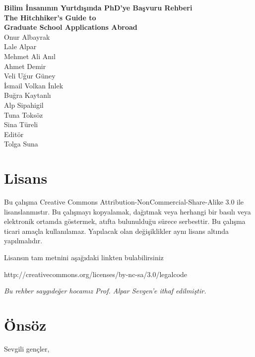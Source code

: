 \documentclass[12pt]{article}
\theoremstyle{break}
\begin{document}
%
%
\thispagestyle{empty}
\setcounter{page}{0}
\begin{center}
\textbf{\Huge{Bilim İnsanının Yurtdışında PhD'ye Başvuru Rehberi} \\
\vspace{8mm}
\Large{The Hitchhiker's Guide to \\ 
\vspace{4mm}
Graduate School Applications Abroad}}\\

\vfill
\Large{Onur Albayrak} 
\\
Lale Alpar
\\
Mehmet Ali Anıl
\\
Ahmet Demir
\\
Veli Uğur Güney 
\\
İsmail Volkan İnlek
\\
Buğra Kaytanlı 
\\
Alp Sipahigil 
\\
Tuna Toksöz 
\\
Sina Türeli 
\\
\vspace{8mm}
\large{
Editör 
\\
Tolga Suna }
\end{center}
%
%
\newpage
\section*{Lisans}

Bu çalışma Creative Commons Attribution-NonCommercial-Share-Alike 3.0 ile lisanslanmıstır. Bu çalışmayı kopyalamak, dağıtmak veya herhangi bir basılı veya elektronik ortamda göstermek, atıfta bulunulduğu sürece serbesttir. Bu çalışma ticari amaçla kullanılamaz. Yapılacak olan değişiklikler aynı lisans altında yapılmalıdır. 

Lisansın tam metnini aşağıdaki linkten bulabilirsiniz

http://creativecommons.org/licenses/by-nc-sa/3.0/legalcode

\byncsa
\newpage
%
%
\vspace*{45mm} 
\textit{Bu rehber saygıdeğer hocamız Prof. Alpar Sevgen'e ithaf edilmiştir.}
%
\newpage
%
%
\tableofcontents
%
\newpage

%
%
\section{Önsöz}
Sevgili gençler,
\end{document}
